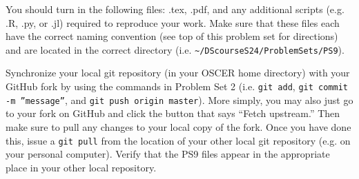 \documentclass[12pt,english]{exam}
\begin{document}
\begin{questions}
\question You should turn in the following files: .tex, .pdf, and any additional scripts (e.g. .R, .py, or .jl) required to reproduce your work.  Make sure that these files each have the correct naming convention (see top of this problem set for directions) and are located in the correct directory (i.e. \texttt{\textasciitilde/DScourseS24/ProblemSets/PS9}).

\question Synchronize your local git repository (in your OSCER home directory) with your GitHub fork by using the commands in Problem Set 2 (i.e. \texttt{git add}, \texttt{git commit -m ''message''}, and \texttt{git push origin master}). More simply, you may also just go to your fork on GitHub and click the button that says ``Fetch upstream.'' Then make sure to pull any changes to your local copy of the fork. Once you have done this, issue a \texttt{git pull} from the location of your other local git repository (e.g. on your personal computer). Verify that the PS9 files appear in the appropriate place in your other local repository.

\end{questions}
\end{document}
